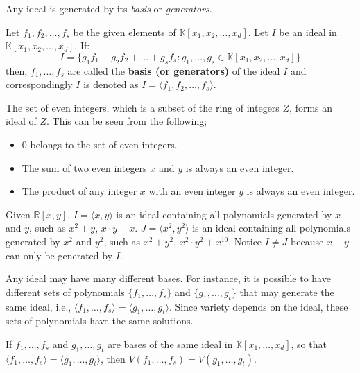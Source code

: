 Any ideal is generated by its {\it basis} or {\it generators}.

\begin{Definition}
Let $f_1, f_2, \ldots, f_s$ be the given elements of $\mathbb{K}[x_1, x_2, \ldots, x_d]$. 
Let $I$ be an ideal in $\mathbb{K}[x_1, x_2, \ldots, x_d]$. If:
\begin{equation}
I = \{g_1 f_1 + g_2 f_2 + \ldots + g_s f_s: g_1, \ldots, g_s \in \mathbb{K}[x_1, x_2, \ldots, x_d]\}
\end{equation}
then, $f_1, \ldots, f_s$ are called the {\bf basis (or generators)} of the ideal $I$ and 
correspondingly $I$ is denoted as $I = \langle f_1, f_2, \ldots, f_s \rangle$. 
\end{Definition}


\begin{Example}
The set of even integers, which is a subset of the ring of integers
$Z$, forms an ideal of $Z$. This can be seen from the following;
\begin{itemize}
\item $0$ belongs to the set of even integers.
\item The sum of two even integers $x$ and $y$ is always an even
  integer.
\item The product of any integer $x$ with an even integer $y$ is
  always an even integer.
\end{itemize}
\end{Example}

\begin{Example}
Given $\mathbb{R}\left[x,y\right]$, $I = \langle x, y \rangle$ is an 
ideal containing all polynomials generated by $x$ and $y$, such as $x^2+y$, $x\cdot y+x$. 
$J = \langle x^2, y^2 \rangle$ is an ideal containing all polynomials generated by $x^2$ and $y^2$, 
such as $x^2+y^2$, $x^2\cdot y^2+x^{10}$. Notice $I\neq J$ because $x+y$ can only be generated by $I$.
\end{Example}


Any ideal may have many different bases. For instance, it is possible to have different sets of polynomials
$\{f_1,\dots,f_{s}\}$ and $\{g_{1},\dots,g_{t}\}$ that may generate the same ideal, i.e., 
$\langle f_{1},\dots,f_{s}\rangle=\langle g_{1},\dots,g_{t}\rangle$. Since variety depends on the ideal, 
these sets of polynomials have the same solutions.

\begin{Proposition}
	If $f_1,\dots,f_{s}$ and $g_{1},\dots,g_{t}$ are bases of the same ideal in $\mathbb{K}[x_{1},\dots,x_{d}]$,
	so that $\langle f_{1},\dots,f_{s}\rangle=\langle g_{1},\dots,g_{t}\rangle$, then 
	$V(f_{1},\dots,f_{s})=V(g_{1},\dots,g_{t})$.
\end{Proposition}

